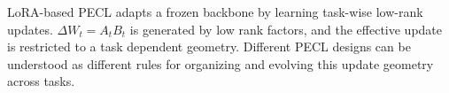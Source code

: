 \documentclass{article}
\begin{document}
LoRA-based PECL adapts a
frozen backbone by learning task-wise low-rank updates.
$\Delta W_t =A_tB_t$ is generated by low rank factors, and the effective update is restricted to a task dependent geometry.
Different PECL designs can be understood as different rules for organizing and evolving this update geometry across tasks.




\end{document}
